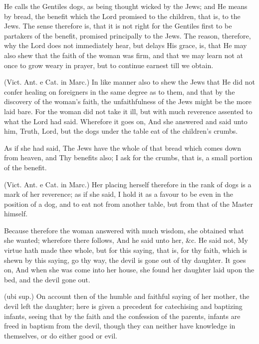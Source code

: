  He calls the Gentiles dogs, as being thought wicked by the Jews; and He means by bread, the benefit which the Lord promised to the children, that is, to the Jews. The sense therefore is, that it is not right for the Gentiles first to be partakers of the benefit, promised principally to the Jews. The reason, therefore, why the Lord does not immediately hear, but delays His grace, is, that He may also shew that the faith of the woman was firm, and that we may learn not at once to grow weary in prayer, but to continue earnest till we obtain.

 (Vict. Ant. e Cat. in Marc.) In like manner also to shew the Jews that He did not confer healing on foreigners in the same degree as to them, and that by the discovery of the woman’s faith, the unfaithfulness of the Jews might be the more laid bare. For the woman did not take it ill, but with much reverence assented to what the Lord had said. Wherefore it goes on, And she answered and said unto him, Truth, Lord, but the dogs under the table eat of the children’s crumbs.

 As if she had said, The Jews have the whole of that bread which comes down from heaven, and Thy benefits also; I ask for the crumbs, that is, a small portion of the benefit.

 (Vict. Ant. e Cat. in Marc.) Her placing herself therefore in the rank of dogs is a mark of her reverence; as if she said, I hold it as a favour to be even in the position of a dog, and to eat not from another table, but from that of the Master himself.

 Because therefore the woman answered with much wisdom, she obtained what she wanted; wherefore there follows, And he said unto her, \&c. He said not, My virtue hath made thee whole, but for this saying, that is, for thy faith, which is shewn by this saying, go thy way, the devil is gone out of thy daughter. It goes on, And when she was come into her house, she found her daughter laid upon the bed, and the devil gone out.

 (ubi sup.) On account then of the humble and faithful saying of her mother, the devil left the daughter; here is given a precedent for catechising and baptizing infants, seeing that by the faith and the confession of the parents, infants are freed in baptism from the devil, though they can neither have knowledge in themselves, or do either good or evil.

